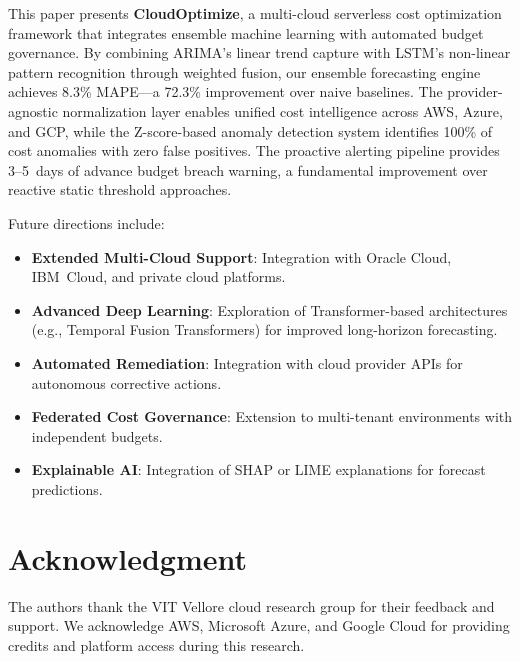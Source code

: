\documentclass[conference]{IEEEtran}
\begin{document}
This paper presents \textbf{CloudOptimize}, a multi-cloud serverless cost optimization framework that integrates ensemble machine learning with automated budget governance. By combining ARIMA's linear trend capture with LSTM's non-linear pattern recognition through weighted fusion, our ensemble forecasting engine achieves 8.3\% MAPE---a 72.3\% improvement over naive baselines. The provider-agnostic normalization layer enables unified cost intelligence across AWS, Azure, and GCP, while the Z-score-based anomaly detection system identifies 100\% of cost anomalies with zero false positives. The proactive alerting pipeline provides 3--5~days of advance budget breach warning, a fundamental improvement over reactive static threshold approaches.

Future directions include:
\begin{itemize}
    \item \textbf{Extended Multi-Cloud Support}: Integration with Oracle Cloud, IBM~Cloud, and private cloud platforms.
    \item \textbf{Advanced Deep Learning}: Exploration of Transformer-based architectures (e.g., Temporal Fusion Transformers) for improved long-horizon forecasting.
    \item \textbf{Automated Remediation}: Integration with cloud provider APIs for autonomous corrective actions.
    \item \textbf{Federated Cost Governance}: Extension to multi-tenant environments with independent budgets.
    \item \textbf{Explainable AI}: Integration of SHAP or LIME explanations for forecast predictions.
\end{itemize}

\section*{Acknowledgment}

The authors thank the VIT Vellore cloud research group for their feedback and support. We acknowledge AWS, Microsoft Azure, and Google Cloud for providing credits and platform access during this research.
\end{document}

